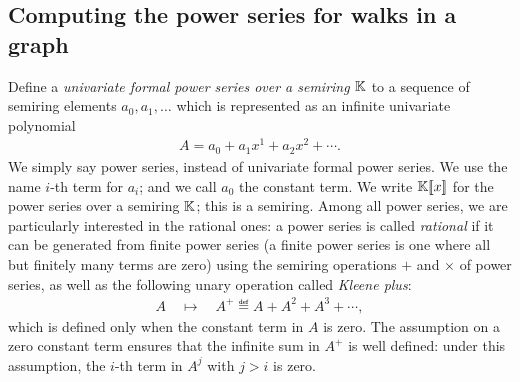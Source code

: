 \subsection{Computing the power series for walks in a graph}
\label{sec:power-series}
Define a \emph{univariate formal power series over a semiring $\mathbb K$} to a sequence of semiring elements $a_0,a_1,\ldots$ which is represented as an infinite univariate polynomial
\begin{align*}
 A = a_0 + a_1x^1 + a_2x^2 + \cdots.
\end{align*}
We simply say power series, instead of univariate formal power series.
We use the name $i$-th term for $a_i$; and we call $a_0$ the constant term.
We write $\mathbb K [\![x]\!]$ for the  power series over a semiring $\mathbb K$; this is a semiring. Among all power series, we are particularly interested in the rational ones: a power series is called \emph{rational} if it can be generated from finite power series (a finite power series is one where all but finitely many terms are zero) using the semiring operations $+$ and $\times$ of power series, as well as the following unary  operation called \emph{Kleene plus}:
\begin{align*}
A \quad \mapsto \quad A^+ \eqdef A + A^2 + A^3 + \cdots,
\end{align*}   
which  is defined only when the constant term   in $A$ is zero. The assumption on a zero constant term ensures that the infinite sum in $A^+$ is well defined: under this assumption, the $i$-th term in $A^j$ with $j>i$ is zero. 


